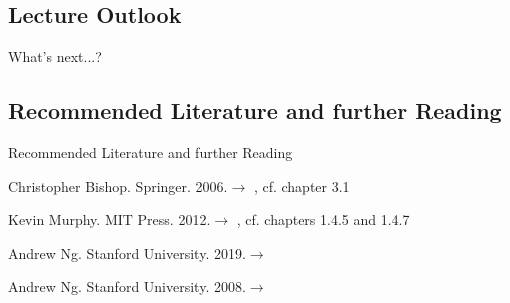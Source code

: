 \subsection{Lecture Outlook}

\begin{frame}{What's next...?}{}
\end{frame}


\subsection{Recommended Literature and further Reading}

\begin{frame}[allowframebreaks]{Recommended Literature and further Reading}{}
	\footnotesize
	\begin{thebibliography}{2}
			{Christopher Bishop. Springer. 2006.}{$\rightarrow$ \href{
				http://users.isr.ist.utl.pt/~wurmd/Livros/school/Bishop\%20-\%20Pattern\%20Recognition\%20And\%20Machine\%20Learning\%20-\%20Springer\%20\%202006.pdf
			}{}, cf. chapter 3.1}
			
			{Kevin Murphy. MIT Press. 2012.}{$\rightarrow$ \href{
				https://doc.lagout.org/science/Artificial\%20Intelligence/Machine\%20learning/Machine\%20Learning_\%20A\%20Probabilistic\%20Perspective\%20\%5BMurphy\%202012-08-24\%5D.pdf
			}{}, cf. chapters 1.4.5 and 1.4.7}	
			
			{Andrew Ng. Stanford University. 2019.}{$\rightarrow$ \href{
				http://cs229.stanford.edu/summer2019/cs229-notes1.pdf
			}{}}
			
			{Andrew Ng. Stanford University. 2008.}{$\rightarrow$ \href{
				https://www.youtube.com/watch?v=5u4G23_OohI
			}{}}
	\end{thebibliography}
\end{frame}


